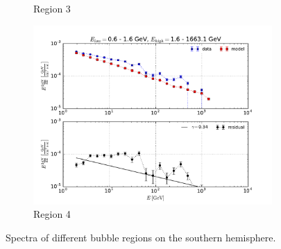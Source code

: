 \documentclass[a4paper]{article}
\begin{document}
\begin{figure}[h]
{\begin{subfigure}[b]{.65\textwidth}
		\caption{Region 3}
	\end{subfigure}
		\begin{subfigure}[b]{.65\textwidth}
		\centering
		\includegraphics[width=.95\textwidth]{Res_SED_b=(-18,-14)_l=(-15,15)_4.pdf}
		\caption{Region 4}
	\end{subfigure}
	}	
\caption{Spectra of different bubble regions on the southern hemisphere.}
\label{SEDs}
\end{figure}
\end{document}
